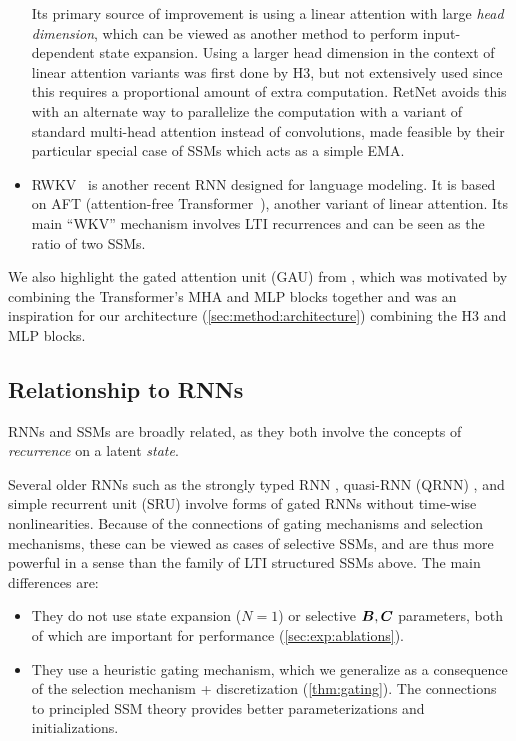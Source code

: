 \begin{itemize}[leftmargin=*,itemsep=0pt,topsep=0pt]
    Its primary source of improvement is using a linear attention with large \emph{head dimension}, which can be viewed as another method to perform input-dependent state expansion.
    Using a larger head dimension in the context of linear attention variants was first done by H3, but not extensively used since this requires a proportional amount of extra computation.
    RetNet avoids this with an alternate way to parallelize the computation with a variant of standard multi-head attention instead of convolutions, made feasible by their particular special case of SSMs which acts as a simple EMA.
  \item RWKV~\citep{peng2023rwkv} is another recent RNN designed for language modeling. It is based on AFT (attention-free Transformer~\citep{zhai2021attention}), another variant of linear attention. Its main ``WKV'' mechanism involves LTI recurrences and can be seen as the ratio of two SSMs.
\end{itemize}

We also highlight the gated attention unit (GAU) from \citet{hua2022transformer},
which was motivated by combining the Transformer's MHA and MLP blocks together and was an
inspiration for our architecture (\cref{sec:method:architecture}) combining the H3 and MLP blocks.

\subsection{Relationship to RNNs}

RNNs and SSMs are broadly related, as they both involve the concepts of \emph{recurrence} on a latent \emph{state}.


Several older RNNs such as the strongly typed RNN \citep{balduzzi2016strongly}, quasi-RNN (QRNN) \citep{bradbury2016quasi}, and simple recurrent unit (SRU) \citep{lei2017simple,lei2021attention} involve forms of gated RNNs without time-wise nonlinearities.
Because of the connections of gating mechanisms and selection mechanisms, these can be viewed as cases of selective SSMs, and are thus more powerful in a sense than the family of LTI structured SSMs above.
The main differences are:
\begin{itemize}
  \item They do not use state expansion ($N=1$) or selective $\bm{B}, \bm{C}$ parameters, both of which are important for performance (\cref{sec:exp:ablations}).
  \item They use a heuristic gating mechanism, which we generalize as a consequence of the selection mechanism + discretization (\cref{thm:gating}).
    The connections to principled SSM theory provides better parameterizations and initializations\iftoggle{arxiv}{ (\cref{sec:method:details})}{}.
\end{itemize}

